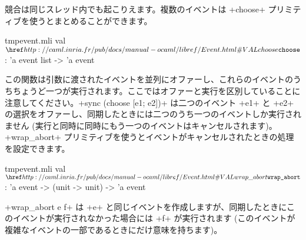 競合は同じスレッド内でも起こりえます。複数のイベントは \ml+choose+ プリミティブを使うとまとめることができます。
%
\begin{listingcodefile}{tmpevent.mli}
val $\indexlibvalue{Event}{choose}$ : 'a event list -> 'a event
\end{listingcodefile}
%
この関数は引数に渡されたイベントを並列にオファーし、これらのイベントのうちちょうど一つが実行されます。ここではオファーと実行を区別していることに注意してください。\ml+sync (choose [e1; e2])+ は二つのイベント \ml+e1+ と \ml+e2+ の選択をオファーし、同期したときには二つのうち一つのイベントしか実行されません (実行と同時に同時にもう一つのイベントはキャンセルされます)。\ml+wrap_abort+ プリミティブを使うとイベントがキャンセルされたときの処理を設定できます。
%
\begin{listingcodefile}{tmpevent.mli}
val $\indexlibvalue{Event}{wrap\_abort}$ : 'a event -> (unit -> unit) -> 'a event
\end{listingcodefile}
%
\ml+wrap_abort e f+ は \ml+e+ と同じイベントを作成しますが、同期したときにこのイベントが実行されなかった場合には \ml+f+ が実行されます (このイベントが複雑なイベントの一部であるときにだけ意味を持ちます)。

